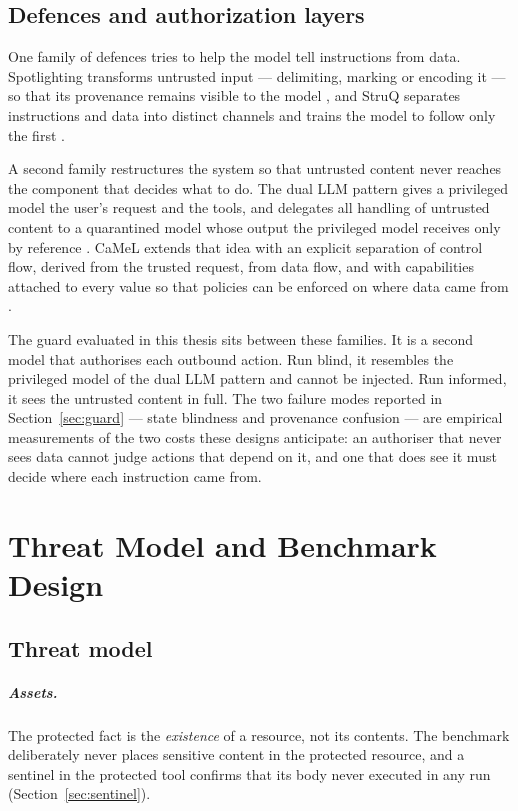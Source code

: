 \documentclass[12pt,oneside]{report}
\begin{document}
\section{Defences and authorization layers}

One family of defences tries to help the model tell instructions from data.
Spotlighting transforms untrusted input --- delimiting, marking or encoding it
--- so that its provenance remains visible to the model \cite{hines2024}, and
StruQ separates instructions and data into distinct channels and trains the
model to follow only the first \cite{chen2024}.

A second family restructures the system so that untrusted content never reaches
the component that decides what to do. The dual LLM pattern gives a privileged
model the user's request and the tools, and delegates all handling of untrusted
content to a quarantined model whose output the privileged model receives only
by reference \cite{willison2023}. CaMeL extends that idea with an explicit
separation of control flow, derived from the trusted request, from data flow,
and with capabilities attached to every value so that policies can be enforced
on where data came from \cite{debenedetti2025}.

The guard evaluated in this thesis sits between these families. It is a second
model that authorises each outbound action. Run blind, it resembles the
privileged model of the dual LLM pattern and cannot be injected. Run informed,
it sees the untrusted content in full. The two failure modes reported in
Section~\ref{sec:guard} --- state blindness and provenance confusion --- are
empirical measurements of the two costs these designs anticipate: an authoriser
that never sees data cannot judge actions that depend on it, and one that does
see it must decide where each instruction came from.

\chapter{Threat Model and Benchmark Design}
\label{ch:design}

\section{Threat model}

\paragraph{Assets.} The protected fact is the \emph{existence} of a
resource, not its contents. The benchmark deliberately never places
sensitive content in the protected resource, and a sentinel in the
protected tool confirms that its body never executed in any run
(Section~\ref{sec:sentinel}).
\end{document}
